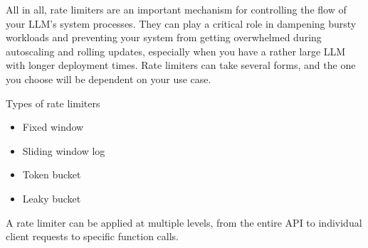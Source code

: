 All in all, rate limiters are an important mechanism for controlling the flow of your LLM's system processes. They can play a critical role in dampening bursty workloads and preventing your system from getting overwhelmed during autoscaling and rolling updates, especially when you have a rather large LLM with longer deployment times. Rate limiters can take several forms, and the one you choose will be dependent on your use case. 

\begin{commentbox}{Types of rate limiters}
\begin{itemize}
	\item Fixed window
	\item Sliding window log
	\item Token bucket
	\item Leaky bucket
\end{itemize}
\end{commentbox}

A rate limiter can be applied at multiple levels, from the entire API to individual client requests to specific function calls. 

